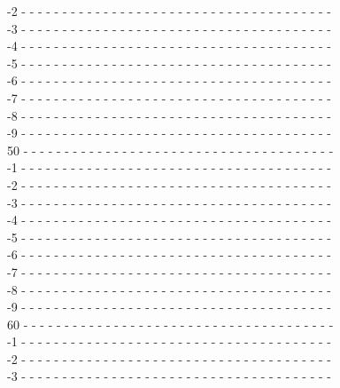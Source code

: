 {\begin{flushleft}
-2 - - - - - - - - - - - - - - - - - - - - - - - - - - - - - - - - - - - - - -\\
-3 - - - - - - - - - - - - - - - - - - - - - - - - - - - - - - - - - - - - - -\\
-4 - - - - - - - - - - - - - - - - - - - - - - - - - - - - - - - - - - - - - -\\
-5 - - - - - - - - - - - - - - - - - - - - - - - - - - - - - - - - - - - - - -\\
-6 - - - - - - - - - - - - - - - - - - - - - - - - - - - - - - - - - - - - - -\\
-7 - - - - - - - - - - - - - - - - - - - - - - - - - - - - - - - - - - - - - -\\
-8 - - - - - - - - - - - - - - - - - - - - - - - - - - - - - - - - - - - - - -\\
-9 - - - - - - - - - - - - - - - - - - - - - - - - - - - - - - - - - - - - - -\\
50 - - - - - - - - - - - - - - - - - - - - - - - - - - - - - - - - - - - - - -\\
-1 - - - - - - - - - - - - - - - - - - - - - - - - - - - - - - - - - - - - - -\\
-2 - - - - - - - - - - - - - - - - - - - - - - - - - - - - - - - - - - - - - -\\
-3 - - - - - - - - - - - - - - - - - - - - - - - - - - - - - - - - - - - - - -\\
-4 - - - - - - - - - - - - - - - - - - - - - - - - - - - - - - - - - - - - - -\\
-5 - - - - - - - - - - - - - - - - - - - - - - - - - - - - - - - - - - - - - -\\
-6 - - - - - - - - - - - - - - - - - - - - - - - - - - - - - - - - - - - - - -\\
-7 - - - - - - - - - - - - - - - - - - - - - - - - - - - - - - - - - - - - - -\\
-8 - - - - - - - - - - - - - - - - - - - - - - - - - - - - - - - - - - - - - -\\
-9 - - - - - - - - - - - - - - - - - - - - - - - - - - - - - - - - - - - - - -\\
60 - - - - - - - - - - - - - - - - - - - - - - - - - - - - - - - - - - - - - -\\
-1 - - - - - - - - - - - - - - - - - - - - - - - - - - - - - - - - - - - - - -\\
-2 - - - - - - - - - - - - - - - - - - - - - - - - - - - - - - - - - - - - - -\\
-3 - - - - - - - - - - - - - - - - - - - - - - - - - - - - - - - - - - - - - -\\

\end{flushleft}}
